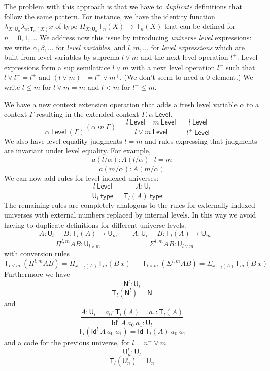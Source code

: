 \documentclass[11pt,a4paper]{article}
\theoremstyle{definition}
\newcommand{\Id}{\mathsf{Id}}
\def\NN{\mathsf{N}}
\def\UU{\mathsf{U}}
\def\Level{\mathsf{Level}}
\newcommand{\type}{\mathsf{type}}
\newcommand{\mypi}[3]{\Pi_{#1:#2}#3}
\newcommand{\mylam}[3]{\lambda_{#1:#2}#3}
\newcommand{\mysig}[3]{\Sigma_{#1:#2}#3}
\newcommand{\T}{\mathsf{T}}
\begin{document}
The problem with this approach is that we have to {\em duplicate} definitions that follow
the same pattern. For instance, we have the identity function $\mylam{X}{\UU_n}{\mylam{x}{\T_n(X)}{x}}$
of type $\mypi{X}{\UU_n}{\T_n(X)\rightarrow \T_n(X)}$ that can be defined for $n = 0,1,\dots$
We address now this issue by introducing {\em universe level}
expressions: we write $\alpha,\beta,\dots$
for {\em level variables}, and $l,m,\dots$ for {\em level expressions} which are built from level variables
by suprema $l \vee m$ and the next level operation $l^+$.
Level expressions form a sup semilattice $l\vee m$
with a next level operation $l^+$ such that $l \vee l^+ = l^+$
and $(l\vee m)^+ = l^+\vee m^+$. (We don't seem to need a $0$ element.)
We write $l\leqslant m$ for $l\vee m = m$ and $l<m$ for $l^+\leqslant m$.


We have a new context extension operation that adds a fresh level variable $\alpha$ to a context $\Gamma$ resulting in the extended context $\Gamma,\alpha~\Level$.
$$
\frac{}{\alpha~\Level~(\Gamma)}(\alpha~in~\Gamma)~~~~~~
\frac{l~\Level~~~~~m~\Level}{l\vee m~\Level}~~~~~~
\frac{l~\Level}{l^+~\Level}~~~~~~
$$
We also have level equality judgments $l = m$ and rules expressing that judgments are invariant under level equality.
For example,
$$
\frac{a(l/\alpha) : A(l/\alpha)\ \ \ l = m}
{a(m/\alpha) : A(m/\alpha)}
$$
We can  now add rules for level-indexed universes:
$$
\frac{l~\Level}{\UU_{l}~\type}~~~~~~
\frac{A:\UU_{l}}{\T_{l}(A)~\type}~~~~~~
$$
The remaining rules are completely analogous to the rules for externally indexed universes with external numbers replaced by internal levels. In this way we avoid having to duplicate definitions for different universe levels.
$$
\frac{A:\UU_{l}~~~~~~B:\T_{l}(A)\rightarrow \UU_{m}}
     {\Pi^{l,m} A B:\UU_{l\vee m}}~~~~~~~~~
\frac{A:\UU_{l}~~~~~~B:\T_{l}(A)\rightarrow \UU_{m}}
     {\Sigma^{l,m} A B:\UU_{l\vee m}}~~~~~~~~~
$$
with conversion rules
$$
\T_{l\vee m}~(\Pi^{l,m} A B) = \mypi{x}{\T_{l}(A)}{ \T_{m}(B~x)}~~~~~~~
\T_{l\vee m}~(\Sigma^{l,m} A B) = \mysig{x}{\T_{l}(A)}{ \T_{m}(B~x)}~~~~~~~
$$
Furthermore we have $$\NN^{l}:\UU_{l}$$
$$\T_{l}(\NN^{l}) = \NN$$
and
$$
\frac{A:\UU_l~~~~~~a_0:\T_l(A)~~~~~~a_1:\T_l(A)}
{\Id^l~A~a_0~a_1:\UU_l}
$$
$$\T_l(\Id^l~A~a_0~a_1) = \Id~\T_l(A)~a_0~a_1$$
and a code for the previous universe, for $l = n^+\vee m$
$${\UU_n^{l}}:\UU_{l}$$
$$\T_{l}({\UU_n^{l}}) = \UU_{n}$$
\end{document}
